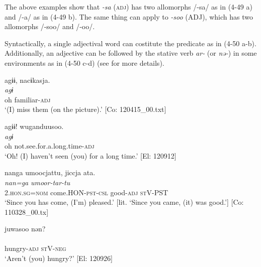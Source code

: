 The above examples show that \textit{{}-sa} (\textsc{adj}) has two allomorphs /-sa/ as in (4-49 a) and /-a/ as in (4-49 b). The same thing can apply to \textit{{}-soo} (ADJ), which has two allomorphs /-soo/ and /-oo/.

Syntactically, a single adjectival word can costitute the predicate as in (4-50 a-b). Additionally, an adjective can be followed by the stative verb \textit{ar-} (or \textit{nə-}) in some environments as in (4-50 c-d) (see  for more details).

\ea  \label{ex:4.50}
\ea  \label{ex:4.50a}%
\glll    agɨɨ,  nacɨkasja.\\
      \textit{agɨ}  \textit{}\\
      oh  familiar-\textsc{adj}\\
      \glt       ‘(I) miss them (on the picture).’ [Co: 120415\_00.txt]

\ex\label{ex:4.50b}%
\glll    agɨɨ!  wuganduusoo.\\
      \textit{agɨ}  \textit{}\\
      oh  not.see.for.a.long.time-\textsc{adj}\\
      \glt       ‘Oh! (I) haven’t seen (you) for a long time.’ [El: 120912]

\ex\label{ex:4.50c}%
\glll    nanga  umoocjattu,  jiccja  ata.\\
      \textit{nan=ga}  \textit{umoor-tar-tu}  \textit{}  \textit{}\\
      2.\textsc{hon}.\textsc{sg}=\textsc{nom}  come.HON-\textsc{pst}-\textsc{csl}  good-\textsc{adj}  \textsc{st}V-PST\\
      \glt       ‘Since you has come, (I’m) pleased.’ [lit. ‘Since you came, (it) was good.’] [Co: 110328\_00.tx]

\ex\label{ex:4.50d}%
\glll    juwasoo  nən?\\
      \textit{}  \textit{}\\
      hungry-\textsc{adj}  \textsc{st}V-\textsc{neg}\\
      \glt       ‘Aren’t (you) hungry?’ [El: 120926]
    \z
\z


